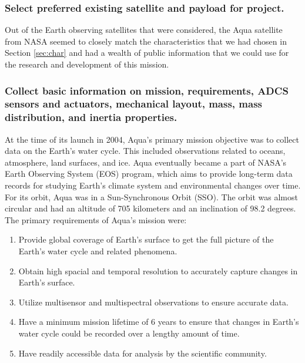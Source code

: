 \subsubsection{Select preferred existing satellite and payload for project.}

Out of the Earth observing satellites that were considered, the Aqua satellite from NASA seemed to closely match the characteristics that we had chosen in Section \ref{sec:char} and had a wealth of public information that we could use for the research and development of this mission.

\subsubsection{Collect basic information on mission, requirements, ADCS sensors and actuators, mechanical layout, mass, mass distribution, and inertia properties.} \label{sec:mission_info}

At the time of its launch in 2004, Aqua's primary mission objective was to collect data on the Earth's water cycle. This included observations related to oceans, atmosphere, land surfaces, and ice. Aqua eventually became a part of NASA's Earth Observing System (EOS) program, which aims to provide long-term data records for studying Earth's climate system and environmental changes over time. For its orbit, Aqua was in a Sun-Synchronous Orbit (SSO). The orbit was almost circular and had an altitude of 705 kilometers and an inclination of 98.2 degrees. \cite{aqua_orbit_info} The primary requirements of Aqua's mission were:

\begin{enumerate}
    \item Provide global coverage of Earth's surface to get the full picture of the Earth's water cycle and related phenomena. \\
    \item Obtain high spacial and temporal resolution to accurately capture changes in Earth's surface. \\
    \item Utilize multisensor and multispectral observations to ensure accurate data. \\
    \item Have a minimum mission lifetime of 6 years to ensure that changes in Earth's water cycle could be recorded over a lengthy amount of time. \\
    \item Have readily accessible data for analysis by the scientific community. 
\end{enumerate}

